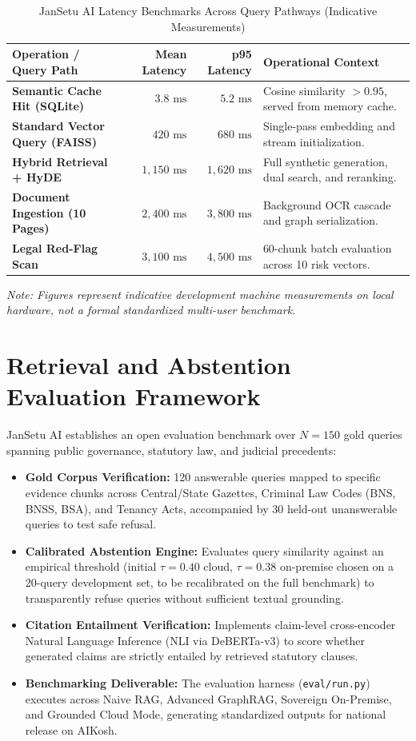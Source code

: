 \documentclass[12pt,a4paper,oneside]{report}
\begin{document}
\begin{table}[H]
\centering
\small
\caption{JanSetu AI Latency Benchmarks Across Query Pathways (Indicative Measurements)}
\label{tab:benchmarks}
\begin{tabularx}{\textwidth}{lrrX}
\toprule
\textbf{Operation / Query Path} & \textbf{Mean Latency} & \textbf{p95 Latency} & \textbf{Operational Context} \\
\midrule
\textbf{Semantic Cache Hit (SQLite)} & $3.8\text{ ms}$ & $5.2\text{ ms}$ & Cosine similarity $> 0.95$, served from memory cache. \\
\textbf{Standard Vector Query (FAISS)} & $420\text{ ms}$ & $680\text{ ms}$ & Single-pass embedding and stream initialization. \\
\textbf{Hybrid Retrieval + HyDE} & $1,150\text{ ms}$ & $1,620\text{ ms}$ & Full synthetic generation, dual search, and reranking. \\
\textbf{Document Ingestion (10 Pages)} & $2,400\text{ ms}$ & $3,800\text{ ms}$ & Background OCR cascade and graph serialization. \\
\textbf{Legal Red-Flag Scan} & $3,100\text{ ms}$ & $4,500\text{ ms}$ & 60-chunk batch evaluation across 10 risk vectors. \\
\bottomrule
\end{tabularx}
\vspace{2pt}
{\footnotesize \textit{Note: Figures represent indicative development machine measurements on local hardware, not a formal standardized multi-user benchmark.}}
\end{table}

\section{Retrieval and Abstention Evaluation Framework}
JanSetu AI establishes an open evaluation benchmark over $N = 150$ gold queries spanning public governance, statutory law, and judicial precedents:
\begin{itemize}[itemsep=3pt]
    \item \textbf{Gold Corpus Verification:} 120 answerable queries mapped to specific evidence chunks across Central/State Gazettes, Criminal Law Codes (BNS, BNSS, BSA), and Tenancy Acts, accompanied by 30 held-out unanswerable queries to test safe refusal.
    \item \textbf{Calibrated Abstention Engine:} Evaluates query similarity against an empirical threshold (initial $\tau = 0.40$ cloud, $\tau = 0.38$ on-premise chosen on a 20-query development set, to be recalibrated on the full benchmark) to transparently refuse queries without sufficient textual grounding.
    \item \textbf{Citation Entailment Verification:} Implements claim-level cross-encoder Natural Language Inference (NLI via DeBERTa-v3) to score whether generated claims are strictly entailed by retrieved statutory clauses.
    \item \textbf{Benchmarking Deliverable:} The evaluation harness (\texttt{eval/run.py}) executes across Naive RAG, Advanced GraphRAG, Sovereign On-Premise, and Grounded Cloud Mode, generating standardized outputs for national release on AIKosh.
\end{itemize}
\end{document}
